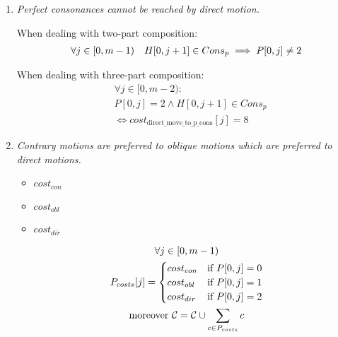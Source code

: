 \begin{enumerate}[wide, label=\bfseries 1.P\arabic*]

\item\label{rule:nopconsbydm}{ \textit{Perfect consonances cannot be reached by direct motion.}}

When dealing with two-part composition:
\begin{equation}
    \begin{gathered}
        \forall j \in [0, m-1)\quad
        H[0, j+1] \in Cons_{p} \implies P[0, j] \neq 2
    \end{gathered}
\end{equation}

When dealing with three-part composition:
\begin{equation} \begin{aligned}
  &\forall j \in [0, m-2) :\\
  &P[0, j] = 2 \land H[0, j+1] \in Cons_{p} \\
  &\iff cost_{\text{{direct\_move\_to\_p\_cons}}}[j] = 8
\end{aligned} \end{equation}

\item\label{rule:codmotions} {\textit{Contrary motions are preferred to oblique motions which are preferred to direct motions.}}

\begin{multicols}{3}
    \begin{itemize}
        \item $cost_{con}$\\ 
        \item $cost_{obl}$\\ 
        \item $cost_{dir}$\\ 
    \end{itemize}
\end{multicols}

\begin{equation}
    \begin{gathered}
        \forall j \in [0, m-1)\\
        P_{costs}[j] = \begin{cases}
            cost_{con} & \text{if } P[0, j] = 0\\
            cost_{obl} & \text{if } P[0, j] = 1\\
            cost_{dir} & \text{if } P[0, j] = 2
        \end{cases}\\
        \text{moreover } \mathcal{C} = \mathcal{C} \cup \sum _{c \in P_{costs}} c
    \end{gathered}
\end{equation}


\end{enumerate}
